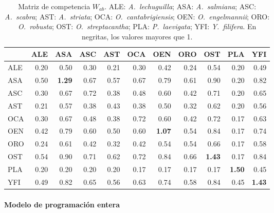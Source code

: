 \begin{table}[t]
\centering
\caption{Matriz de competencia $W_{ab}$. ALE: \textit{A.~lechuguilla}; ASA: \textit{A.~salmiana}; ASC: \textit{A.~scabra}; AST: \textit{A.~striata}; OCA: \textit{O.~cantabrigiensis}; OEN: \textit{O.~engelmannii}; ORO: \textit{O.~robusta}; OST: \textit{O.~streptacantha}; PLA: \textit{P.~laevigata}; YFI: \textit{Y.~filifera}. En negritas, los valores mayores que 1.}
\label{tab:matriz-competencia}
\scriptsize
\setlength{\tabcolsep}{2.4pt}
\begin{tabular}{@{}lrrrrrrrrrr@{}}
\toprule
 & ALE & ASA & ASC & AST & OCA & OEN & ORO & OST & PLA & YFI \\
\midrule
ALE & 0.20 & 0.50 & 0.30 & 0.21 & 0.30 & 0.42 & 0.24 & 0.54 & 0.20 & 0.49 \\
ASA & 0.50 & \textbf{1.29} & 0.67 & 0.57 & 0.67 & 0.79 & 0.61 & 0.90 & 0.20 & 0.82 \\
ASC & 0.30 & 0.67 & 0.72 & 0.38 & 0.48 & 0.60 & 0.42 & 0.71 & 0.20 & 0.65 \\
AST & 0.21 & 0.57 & 0.38 & 0.43 & 0.38 & 0.50 & 0.32 & 0.62 & 0.20 & 0.56 \\
OCA & 0.30 & 0.67 & 0.48 & 0.38 & 0.72 & 0.60 & 0.42 & 0.72 & 0.17 & 0.63 \\
OEN & 0.42 & 0.79 & 0.60 & 0.50 & 0.60 & \textbf{1.07} & 0.54 & 0.84 & 0.17 & 0.74 \\
ORO & 0.24 & 0.61 & 0.42 & 0.32 & 0.42 & 0.54 & 0.54 & 0.66 & 0.17 & 0.58 \\
OST & 0.54 & 0.90 & 0.71 & 0.62 & 0.72 & 0.84 & 0.66 & \textbf{1.43} & 0.17 & 0.84 \\
PLA & 0.20 & 0.20 & 0.20 & 0.20 & 0.17 & 0.17 & 0.17 & 0.17 & \textbf{1.50} & 0.45 \\
YFI & 0.49 & 0.82 & 0.65 & 0.56 & 0.63 & 0.74 & 0.58 & 0.84 & 0.45 & \textbf{1.43} \\
\bottomrule
\end{tabular}
\end{table}

\paragraph{Modelo de programación entera}
\label{subsec:espacial-entera}

